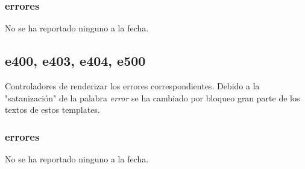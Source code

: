 \documentclass[10pt,a4paper]{book}
\begin{document}
	\subsubsection{errores}
	No se ha reportado ninguno a la fecha.

	\subsection{e400, e403, e404, e500}
	Controladores de renderizar los errores correspondientes. Debido a la "satanización" de la palabra \textit{error} se ha cambiado por bloqueo gran parte de los textos de estos templates.
	
	\subsubsection{errores}
	No se ha reportado ninguno a la fecha.
	

	
	
\end{document}
